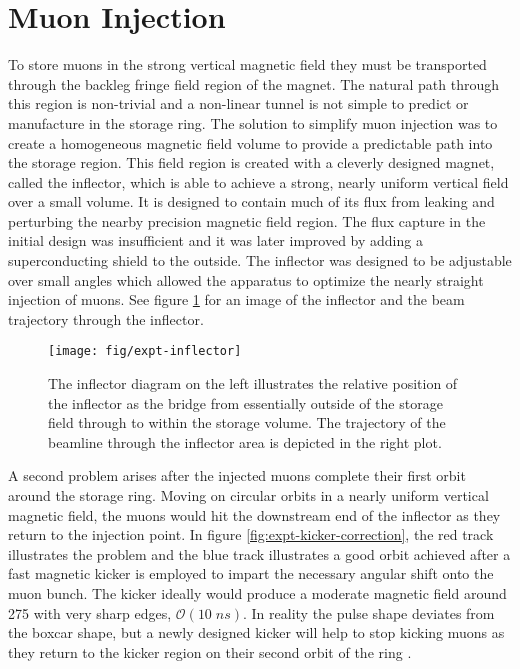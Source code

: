 \section{Muon Injection} \label{sec:muon-injection}
To store muons in the strong vertical magnetic field they must be transported through the backleg fringe field region of the magnet.  The natural path through this region is non-trivial and a non-linear tunnel is not simple to predict or manufacture in the storage ring.  The solution to simplify muon injection was to create a homogeneous magnetic field volume to provide a predictable path into the storage region. This field region is created with a cleverly designed magnet, called the inflector, which is able to achieve a strong, nearly uniform vertical field over a small volume.  It is designed to contain much of its flux from leaking and perturbing the nearby precision magnetic field region.  The flux capture in the initial design was insufficient and it was later improved by adding a superconducting shield to the outside.  The inflector was designed to be adjustable over small angles which allowed the apparatus to optimize the nearly straight injection of muons. See figure \ref{fig:expt-inflector} for an image of the inflector and the beam trajectory through the inflector. \cite{e989-tdr, e821-prd}

\begin{figure}
\label{fig:expt-inflector}
\texttt{[image: fig/expt-inflector]}
\caption{The inflector diagram on the left illustrates the relative position of the inflector as the bridge from essentially outside of the storage field through to within the storage volume.  The trajectory of the beamline through the inflector area is depicted in the right plot.}
\end{figure}

A second problem arises after the injected muons complete their first orbit around the storage ring.  Moving on circular orbits in a nearly uniform vertical magnetic field, the muons would hit the downstream end of the inflector as they return to the injection point.  In figure \ref{fig:expt-kicker-correction}, the red track illustrates the problem and the blue track illustrates a good orbit achieved after a fast magnetic kicker is employed to impart the necessary angular shift onto the muon bunch.  The kicker ideally would produce a moderate magnetic field around \SI{275}{\gauss} with very sharp edges, $\mathcal{O}(10\;ns)$. In reality the pulse shape deviates from the boxcar shape, but a newly designed kicker will help to stop kicking muons as they return to the kicker region on their second orbit of the ring \cite{e989-tdr}.  

